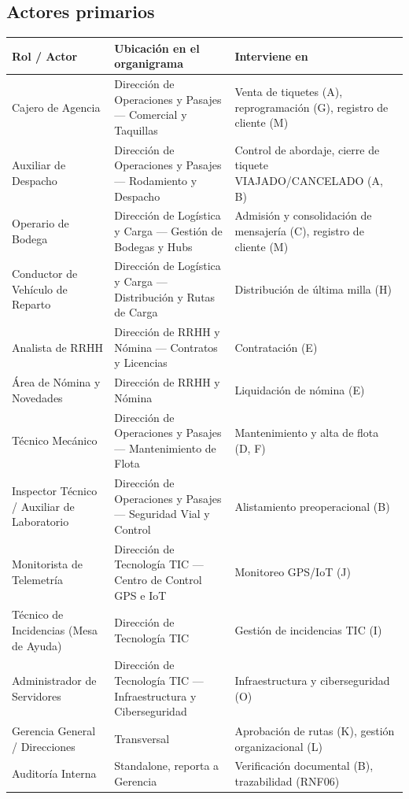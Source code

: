 \documentclass[11pt,a4paper]{article}
\begin{document}
\subsection{Actores primarios}

{
\begin{longtable}{L{3.6cm} L{4.6cm} L{6.5cm}}
\toprule
{}\textbf{Rol / Actor} & \textbf{Ubicación en el organigrama} & \textbf{Interviene en} \\
\midrule
\endhead
Cajero de Agencia & Dirección de Operaciones y Pasajes --- Comercial y Taquillas & Venta de tiquetes (A), reprogramación (G), registro de cliente (M) \\
Auxiliar de Despacho & Dirección de Operaciones y Pasajes --- Rodamiento y Despacho & Control de abordaje, cierre de tiquete VIAJADO/CANCELADO (A, B) \\
Operario de Bodega & Dirección de Logística y Carga --- Gestión de Bodegas y Hubs & Admisión y consolidación de mensajería (C), registro de cliente (M) \\
Conductor de Vehículo de Reparto & Dirección de Logística y Carga --- Distribución y Rutas de Carga & Distribución de última milla (H) \\
Analista de RRHH & Dirección de RRHH y Nómina --- Contratos y Licencias & Contratación (E) \\
Área de Nómina y Novedades & Dirección de RRHH y Nómina & Liquidación de nómina (E) \\
Técnico Mecánico & Dirección de Operaciones y Pasajes --- Mantenimiento de Flota & Mantenimiento y alta de flota (D, F) \\
Inspector Técnico / Auxiliar de Laboratorio & Dirección de Operaciones y Pasajes --- Seguridad Vial y Control & Alistamiento preoperacional (B) \\
Monitorista de Telemetría & Dirección de Tecnología TIC --- Centro de Control GPS e IoT & Monitoreo GPS/IoT (J) \\
Técnico de Incidencias (Mesa de Ayuda) & Dirección de Tecnología TIC & Gestión de incidencias TIC (I) \\
Administrador de Servidores & Dirección de Tecnología TIC --- Infraestructura y Ciberseguridad & Infraestructura y ciberseguridad (O) \\
Gerencia General / Direcciones & Transversal & Aprobación de rutas (K), gestión organizacional (L) \\
Auditoría Interna & Standalone, reporta a Gerencia & Verificación documental (B), trazabilidad (RNF06) \\
\bottomrule
\end{longtable}
}
\end{document}
